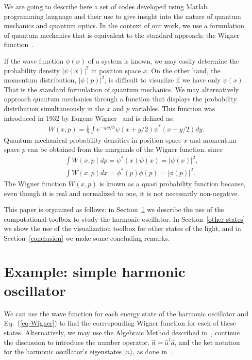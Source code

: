 \documentclass[twocolumn]{rbef}
\begin{document}
We are going to describe here a set of codes developed using Matlab programming language and their use to give insight into the nature of quantum mechanics and quantum optics. In the context of our work, we use a formulation of quantum mechanics that is equivalent to the standard approach: the Wigner function~\cite{Case2008}.

If the wave function $\psi(x)$ of a system is known, we may easily determine the probability density $|\psi(x)|^2$ in position space $x$. On the other hand, the momentum distribution, $|\phi(p)|^2$, is difficult to visualize if we have only $\psi(x)$. That is the standard formulation of quantum mechanics. We may alternatively approach quantum mechanics through a function that displays the probability distribution simultaneously in the $x$ and $p$ variables. This function was introduced in 1932 by Eugene Wigner~\cite{Wigner1932} and is defined as:
\begin{eqnarray}
W(x,p) = \frac{1}{h} \int e^{-i p y/\hbar} \psi(x+y/2) \psi^{\ast}(x-y/2) dy.
\label{eq-Wigner}
\end{eqnarray}
Quantum mechanical probability densities in position space $x$ and momentum space $p$ can be obtained from the marginals of the Wigner function, since
\begin{eqnarray}
&&\int W(x,p) dp = \psi^{\ast}(x) \psi(x) = |\psi(x)|^2, \nonumber \\
&&\int W(x,p) dx = \phi^{\ast}(p) \phi(p) = |\phi(p)|^2.
\end{eqnarray}
The Wigner function $W(x, p)$ is known as a quasi probability function because, even though it is real and normalized to one, it is not necessarily non-negative.

This paper is organized as follows: in Section~\ref{harmonic-oscillator} we describe the use of the computational toolbox to study the harmonic oscillator. In Section~\ref{other-states} we show the use of the visualization toolbox for other states of the light, and in Section~\ref{conclusion} we make some concluding remarks.

\section{Example: simple harmonic oscillator}
\label{harmonic-oscillator}
We can use the wave function for each energy state of the harmonic oscillator and Eq.~(\ref{eq-Wigner}) to find the corresponding Wigner function for each of these states. Alternatively, we may use the Algebraic Method described in~\cite{Griffiths2004}, continue the discussion to introduce the number operator, $\hat{n} = \hat{a}^{\dagger}\hat{a}$, and the ket notation for the harmonic oscillator's eigenstates $|n\rangle$, as done in~\cite{Sakurai1993}.
\end{document}
